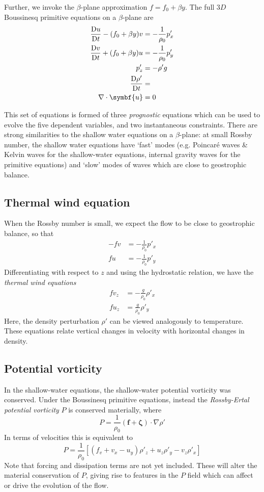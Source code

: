 \documentclass{jknotes}
\begin{document}
Further, we invoke the $\beta$-plane approximation $f = f_0 + \beta y$. The
full $3D$ Boussinesq primitive equations on a $\beta$-plane are
\begin{align}
	\frac{\diffD u}{\diffD t} - (f_0+\beta y)v &= -\frac{1}{\rho_0} p'_x \\
	\frac{\diffD v}{\diffD t} + (f_0 + \beta y) u &= -\frac{1}{\rho_0} p'_y \\
	p'_z &= -\rho' g \\
	\frac{\diffD \rho'}{\diffD t} &= \\
	\nabla \cdot \symbf{u} &= 0
\end{align}

This set of equations is formed of three \emph{prognostic} equations which can
be used to evolve the five dependent variables, and two instantaneous
constraints. There are strong similarities to the shallow water equations on a
$\beta$-plane: at small Rossby number, the shallow water equations have
`fast' modes (e.g. Poincar\'{e} waves \& Kelvin waves for the shallow-water
equations, internal gravity waves for the primitive equations) and `slow'
modes of waves which are close to geostrophic balance.

\subsection{Thermal wind equation}
When the Rossby number is small, we expect the flow to be close to geostrophic
balance, so that
\begin{align}
	-fv &= -\frac{1}{\rho_0} p'_x \\
	fu &= -\frac{1}{\rho_0} p'_y
\end{align}
Differentiating with respect to $z$ and using the hydrostatic relation, we
have the \emph{thermal wind equations}
\begin{align}
	fv_z &= -\frac{g}{\rho_0} \rho'_x \\
	fu_z &= \frac{g}{\rho_0} \rho'_y
\end{align}
Here, the density perturbation $\rho'$ can be viewed analogously to
temperature. These equations relate vertical changes in velocity with
horizontal changes in density.

\subsection{Potential vorticity}
In the shallow-water equations, the shallow-water potential vorticity was
conserved. Under the Boussinesq primitive equations, instead the
\emph{Rossby-Ertal potential vorticity} $P$ is conserved materially, where
\begin{equation}
	P = \frac{1}{\rho_0} (\symbf{f} +\symbf{\zeta})\cdot \nabla \rho'
\end{equation}
In terms of velocities this is equivalent to
\begin{equation}
	P = \frac{1}{\rho_0} \left[ (f_v + v_x - u_y) \rho'_z + u_z \rho'_y -
		v_z
	\rho'_x\right]
\end{equation}
Note that forcing and dissipation terms are not yet included. These will alter
the material conservation of $P$, giving rise to features in the $P$ field
which can affect or drive the evolution of the flow.
\end{document}
